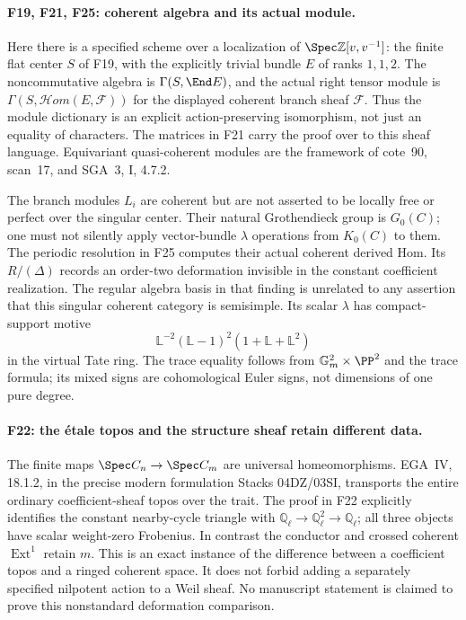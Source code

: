 \documentclass[11pt,a4paper]{article}
\newcommand{\Q}{\mathbb Q}\newcommand{\Z}{\mathbb Z}\newcommand{\C}{\mathbb C}\newcommand{\N}{\mathbb N}\newcommand{\F}{\mathbb F}
\newcommand{\fid}[1]{\textsf{#1}}\newcommand{\gate}[1]{\textsf{#1}}
\theoremstyle{named}\newtheorem{finding}{Finding}[section]
\theoremstyle{definition}\newtheorem{definition}[finding]{Definition}
\theoremstyle{remark}\newtheorem{remark}[finding]{Remark}
\begin{document}
\paragraph{\fid{F19}, \fid{F21}, \fid{F25}: coherent algebra and its actual module.}
Here there is a specified scheme over a localization of
$\Spec\Z[v,v^{-1}]$: the finite flat center $S$ of \fid{F19}, with
the explicitly trivial bundle $E$ of ranks $1,1,2$.
The noncommutative algebra is $\Gamma(S,\End E)$, and the actual
right tensor module is $\Gamma(S,\mathcal Hom(E,\mathcal F))$ for
the displayed coherent branch sheaf $\mathcal F$. Thus the module
dictionary is an explicit action-preserving isomorphism, not just
an equality of characters. The matrices in \fid{F21} carry the proof
over to this sheaf language. Equivariant quasi-coherent modules are
the framework of cote~90, scan~17, and SGA~3, I, 4.7.2.

The branch modules $L_i$ are coherent but are not asserted to be
locally free or perfect over the singular center. Their natural
Grothendieck group is $G_0(C)$; one must not silently apply vector-bundle
$\lambda$ operations from $K_0(C)$ to them. The periodic resolution
in \fid{F25} computes their actual coherent derived Hom. Its
$R/(\Delta)$ records an order-two deformation invisible in the
constant coefficient realization. The regular algebra basis in that
finding is unrelated to any assertion that this singular coherent
category is semisimple. Its scalar $\lambda$ has compact-support motive
\[
 \mathbb L^{-2}(\mathbb L-1)^2(1+\mathbb L+\mathbb L^2)
\]
in the virtual Tate ring. The trace equality follows from
$\mathbb G_m^2\times\PP^2$ and the trace formula; its mixed signs are
cohomological Euler signs, not dimensions of one pure degree.

\paragraph{\fid{F22}: the \'etale topos and the structure sheaf retain different data.}
The finite maps $\Spec C_n\to\Spec C_m$ are universal
homeomorphisms. EGA~IV, 18.1.2, in the precise modern formulation
Stacks 04DZ/03SI, transports the entire ordinary coefficient-sheaf
topos over the trait. The proof in \fid{F22} explicitly identifies
the constant nearby-cycle triangle with
$\Q_\ell\to\Q_\ell^2\to\Q_\ell$; all three objects have scalar
weight-zero Frobenius. In contrast the conductor and crossed coherent
$\operatorname{Ext}^1$ retain $m$. This is an exact instance of the
difference between a coefficient topos and a ringed coherent space.
It does not forbid adding a separately specified nilpotent action to
a Weil sheaf. No manuscript statement is claimed to prove this
nonstandard deformation comparison.
\end{document}
